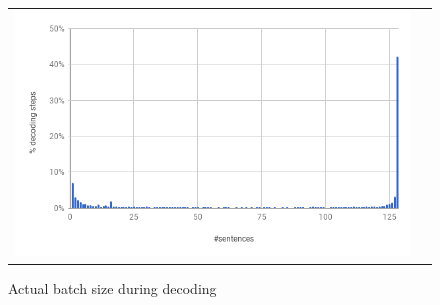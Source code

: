 \documentclass[11pt,a4paper]{article}
\begin{document}
\begin{figure}[h]
\centering
\begin{tabular}{cc}
{\includegraphics[scale=0.3]{batch-size.png}} 
\end{tabular}
\caption{Actual batch size during decoding}
\label{fig:batch-size}
\end{figure} 
\end{document}
